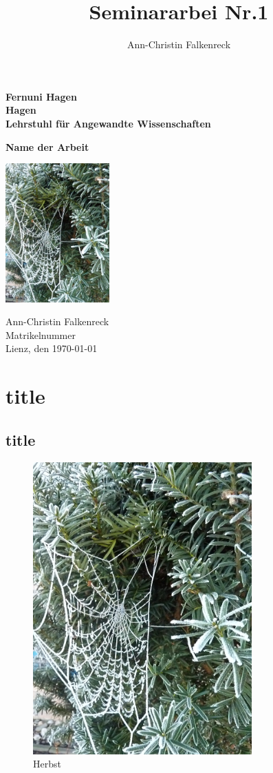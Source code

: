 \documentclass[ngerman,12pt,parskip=half]{scrreprt}
\author{Ann-Christin Falkenreck}
\title{Seminararbei Nr.1}
\begin{document}
	\begin{titlepage}
		
	{\large\textbf{Fernuni Hagen \\ Hagen \\ Lehrstuhl für Angewandte Wissenschaften}}
		
	\vspace*{4cm}
		
	{\bfseries\huge Name der Arbeit}
		
	\begin{center}
		\includegraphics[width=4cm]{Bilder/Herbst}
	\end{center}
		
	\vfill
	Ann-Christin Falkenreck\\
	Matrikelnummer \\
	Lienz, den \today
		
	\end{titlepage}
	
\tableofcontents
\listoffigures
\listoftables
	
\chapter{title}
\section{title}
	\begin{figure}
		\centering
		\includegraphics[width=0.75\textwidth]{Bilder/Herbst}
		\caption{Herbst}\label{fig:Herbst}
	\end{figure}

	
	
	
\end{document}
